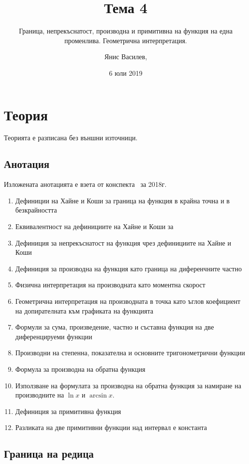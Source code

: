 \documentclass[numbers=endperiod, bibliography=totocnumbered]{scrartcl}
\title{Тема 4}
\subtitle{Граница, непрекъснатост, производна и примитивна на функция на една променлива. Геометрична интерпретация.}
\author{Янис Василев, \Email{ianis@ivasilev.net}}
\date{6 юли 2019}
\begin{document}
\maketitle

\section{Теория}

Теорията е разписана без външни източници.

\subsection{Анотация}

Изложената анотацията е взета от конспекта~\cite{Syllabus} за 2018г.

\begin{enumerate}
  \item Дефиниции на Хайне и Коши за граница на функция в крайна точна и в безкрайността
  \item Еквивалентност на дефинициите на Хайне и Коши за
  \item Дефиниция за непрекъснатост на функция чрез дефинициите на Хайне и Коши
  \item Дефиниция за производна на функция като граница на диференчните частно
  \item Физична интерпретация на производната като моментна скорост
  \item Геометрична интерпретация на производната в точка като ъглов коефициент на допирателната към графиката на функцията
  \item Формули за сума, произведение, частно и съставна функция на две диференцируеми функции
  \item Производни на степенна, показателна и основните тригонометрични функции
  \item Формула за производна на обратна функция
  \item Използване на формулата за производна на обратна функция за намиране на производните на \( \ln x \) и \( \arcsin x \).
  \item Дефиниция за примитивна функция
  \item Разликата на две примитивни функции над интервал е константа
\end{enumerate}

\subsection{Граница на редица}
\end{document}

